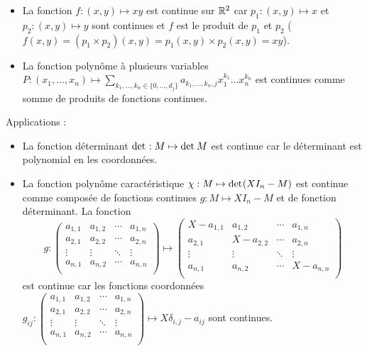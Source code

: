 \documentclass{book}
\begin{document}
\begin{Exemple}
\begin{itemize}
\item La fonction $f:(x,y)\mapsto xy$ est continue sur $\R^2$ car $p_1:(x,y)\mapsto x $ et $p_2:(x,y)\mapsto y $ sont continues et $f$ est le produit de $p_1$ et $p_2$ ($f(x,y)=(p_1\times p_2)(x,y)=p_1(x,y)\times p_2(x,y) = x y$). 
\item La fonction polynôme à plusieurs variables $P:(x_1,\dots,x_n)\mapsto \sum\limits_{k_{1},\ldots ,k_{n}\in \{0,\ldots ,d_{j}\}}a_{k_{1},\ldots ,k_{n},j}x_{1}^{k_{1}}\ldots x_{n}^{k_{n}}$ est continues comme somme de produits de fonctions continues. 
\end{itemize}
Applications :
\begin{itemize}
\item La fonction déterminant $\Det[]:M \mapsto \Det[] M $ est continue car le déterminant est polynomial en les coordonnées.
\item La fonction polynôme caractéristique $\chi:M \mapsto \Det[](XI_n-M) $ est continue comme composée de fonctions continues $g:M\mapsto XI_n-M$ et de fonction déterminant. La fonction $$g:\begin{pmatrix}a_{1,1}&a_{1,2}&\cdots &a_{1,n}\\a_{2,1}&a_{2,2}&\cdots &a_{2,n}\\\vdots &\vdots &\ddots &\vdots \\a_{n,1}&a_{n,2}&\cdots &a_{n,n}\\\end{pmatrix} \mapsto \begin{pmatrix}X-a_{1,1}&a_{1,2}&\cdots &a_{1,n}\\a_{2,1}&X-a_{2,2}&\cdots &a_{2,n}\\\vdots &\vdots &\ddots &\vdots \\a_{n,1}&a_{n,2}&\cdots &X-a_{n,n}\\\end{pmatrix}$$ est continue car les fonctions coordonnées $g_{i j}:\begin{pmatrix}a_{1,1}&a_{1,2}&\cdots &a_{1,n}\\a_{2,1}&a_{2,2}&\cdots &a_{2,n}\\\vdots &\vdots &\ddots &\vdots \\a_{n,1}&a_{n,2}&\cdots &a_{n,n}\\\end{pmatrix}\mapsto X\delta_{i,j}-a_{i j}$ sont continues.
\end{itemize}
\end{Exemple}
\end{document}
